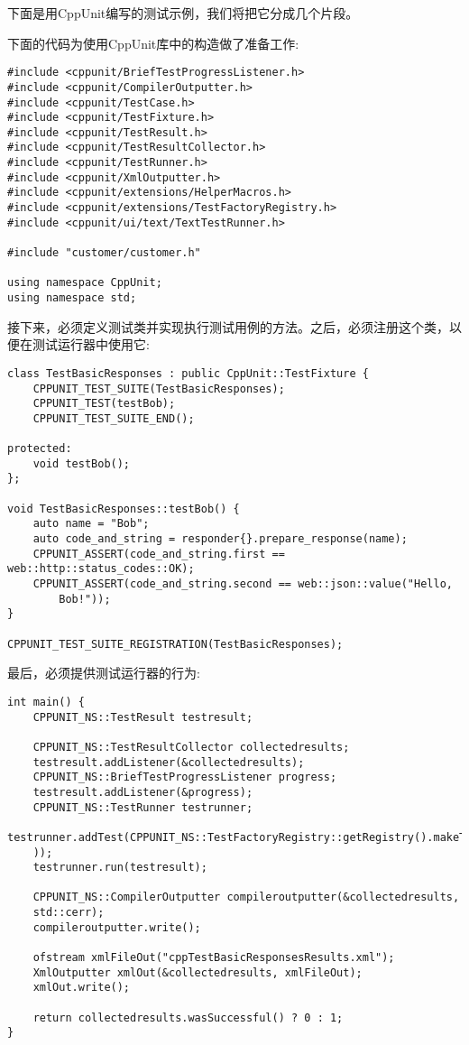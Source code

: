下面是用CppUnit编写的测试示例，我们将把它分成几个片段。

下面的代码为使用CppUnit库中的构造做了准备工作:

\begin{lstlisting}[style=styleCXX]
#include <cppunit/BriefTestProgressListener.h>
#include <cppunit/CompilerOutputter.h>
#include <cppunit/TestCase.h>
#include <cppunit/TestFixture.h>
#include <cppunit/TestResult.h>
#include <cppunit/TestResultCollector.h>
#include <cppunit/TestRunner.h>
#include <cppunit/XmlOutputter.h>
#include <cppunit/extensions/HelperMacros.h>
#include <cppunit/extensions/TestFactoryRegistry.h>
#include <cppunit/ui/text/TextTestRunner.h>

#include "customer/customer.h"

using namespace CppUnit;
using namespace std;
\end{lstlisting}

接下来，必须定义测试类并实现执行测试用例的方法。之后，必须注册这个类，以便在测试运行器中使用它:

\begin{lstlisting}[style=styleCXX]
class TestBasicResponses : public CppUnit::TestFixture {
	CPPUNIT_TEST_SUITE(TestBasicResponses);
	CPPUNIT_TEST(testBob);
	CPPUNIT_TEST_SUITE_END();
	
protected:
	void testBob();
};

void TestBasicResponses::testBob() {
	auto name = "Bob";
	auto code_and_string = responder{}.prepare_response(name);
	CPPUNIT_ASSERT(code_and_string.first == web::http::status_codes::OK);
	CPPUNIT_ASSERT(code_and_string.second == web::json::value("Hello,
		Bob!"));
}

CPPUNIT_TEST_SUITE_REGISTRATION(TestBasicResponses);
\end{lstlisting}

最后，必须提供测试运行器的行为:

\begin{lstlisting}[style=styleCXX]
int main() {
	CPPUNIT_NS::TestResult testresult;
	
	CPPUNIT_NS::TestResultCollector collectedresults;
	testresult.addListener(&collectedresults);
	CPPUNIT_NS::BriefTestProgressListener progress;
	testresult.addListener(&progress);
	CPPUNIT_NS::TestRunner testrunner;
	testrunner.addTest(CPPUNIT_NS::TestFactoryRegistry::getRegistry().makeTest(
	));
	testrunner.run(testresult);
	
	CPPUNIT_NS::CompilerOutputter compileroutputter(&collectedresults,
	std::cerr);
	compileroutputter.write();
	
	ofstream xmlFileOut("cppTestBasicResponsesResults.xml");
	XmlOutputter xmlOut(&collectedresults, xmlFileOut);
	xmlOut.write();
	
	return collectedresults.wasSuccessful() ? 0 : 1;
}
\end{lstlisting}

